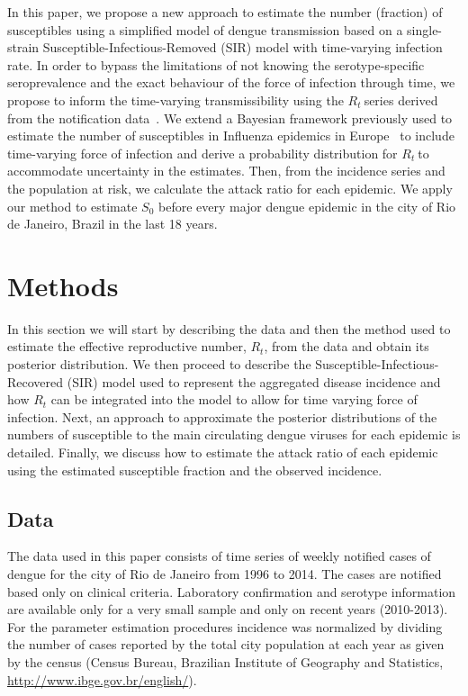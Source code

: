 \documentclass[10pt]{article}
\def \rr {$R_{t}\:$}
\begin{document}
In this paper, we propose a new approach to estimate the number (fraction) of 
susceptibles using a simplified model of dengue transmission based on a 
single-strain Susceptible-Infectious-Removed (SIR) model with time-varying 
infection rate.
In order to bypass the limitations of not knowing the serotype-specific 
seroprevalence and the exact behaviour of the force of infection through time, 
we
propose to inform the time-varying transmissibility using the \rr series 
derived from the notification data~\cite{nishiura}.
We extend a Bayesian framework previously used to estimate the number 
of susceptibles in Influenza epidemics in Europe~\cite{pone2011} to include 
time-varying force of infection and derive a probability distribution  for 
\rr to accommodate uncertainty in the estimates. 
Then, from the incidence series and the population at risk, we  calculate the 
attack ratio for each epidemic.
We apply our method to estimate $S_0$ before every major dengue epidemic in the 
city of Rio de Janeiro, Brazil in the last 18 years.



\section*{Methods}

In this section we will start by describing the data and then the method used 
to estimate the effective reproductive number, $R_t$, from the data and obtain 
its posterior distribution. 
We then proceed to describe the Susceptible-Infectious-Recovered (SIR) model 
used to represent the aggregated disease incidence and how $R_t$ can be 
integrated into the model to allow for time varying force of infection. 
Next, an approach to approximate the posterior distributions 
of the numbers of susceptible to the main circulating dengue viruses for each 
epidemic is detailed.
Finally, we discuss how to estimate the attack ratio of each 
epidemic using the estimated susceptible fraction and the observed incidence.

\subsection*{Data} 

The data used in this paper consists of time 
series of weekly notified cases of dengue for the 
city of Rio de Janeiro from 1996 to 2014. The cases are notified 
based only on clinical criteria.
Laboratory confirmation and serotype 
information are available only for a very small sample and only on recent 
years (2010-2013).
For the parameter estimation  procedures incidence was normalized by dividing 
the number of cases reported by the total city population at each year as given 
by the census (Census Bureau, Brazilian Institute of Geography and Statistics, 
\url{http://www.ibge.gov.br/english/}).
\end{document}
